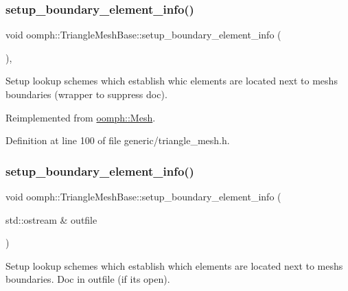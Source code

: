 \subsubsection{\texorpdfstring{setup\+\_\+boundary\+\_\+element\+\_\+info()}{setup\_boundary\_element\_info()}\hspace{0.1cm}{\footnotesize\ttfamily [1/2]}}
{\footnotesize\ttfamily void oomph\+::\+Triangle\+Mesh\+Base\+::setup\+\_\+boundary\+\_\+element\+\_\+info (\begin{DoxyParamCaption}{ }\end{DoxyParamCaption})\hspace{0.3cm}{\ttfamily [inline]}, {\ttfamily [virtual]}}

Setup lookup schemes which establish whic elements are located next to mesh\textquotesingle{}s boundaries (wrapper to suppress doc). 

Reimplemented from \hyperlink{classoomph_1_1Mesh_a6cc8bcd6b41209f0e9295cc993d9c6bb}{oomph\+::\+Mesh}.



Definition at line 100 of file generic/triangle\+\_\+mesh.\+h.

\mbox{\label{classoomph_1_1TriangleMeshBase_a187fd9dbc558b9d19a02d92ce876507c}} 
\subsubsection{\texorpdfstring{setup\+\_\+boundary\+\_\+element\+\_\+info()}{setup\_boundary\_element\_info()}\hspace{0.1cm}{\footnotesize\ttfamily [2/2]}}
{\footnotesize\ttfamily void oomph\+::\+Triangle\+Mesh\+Base\+::setup\+\_\+boundary\+\_\+element\+\_\+info (\begin{DoxyParamCaption}\item[{std\+::ostream \&}]{outfile }\end{DoxyParamCaption})\hspace{0.3cm}{\ttfamily [virtual]}}



Setup lookup schemes which establish which elements are located next to mesh\textquotesingle{}s boundaries. Doc in outfile (if it\textquotesingle{}s open). 

